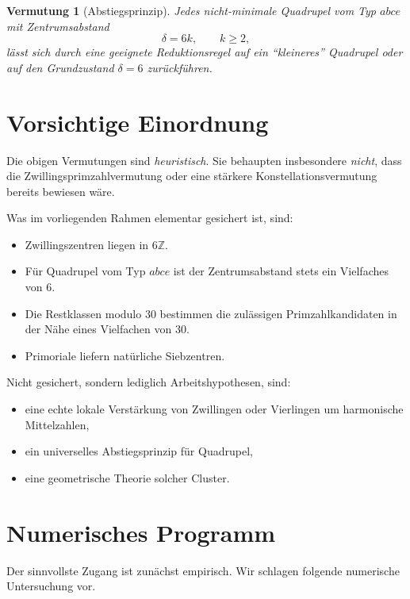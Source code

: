 \documentclass[11pt,a4paper]{article}
\theoremstyle{definition}
\theoremstyle{plain}
\newtheorem{conjecture}[definition]{Vermutung}
\theoremstyle{remark}
\newcommand{\Z}{\mathbb{Z}}
\begin{document}
	\begin{conjecture}[Abstiegsprinzip]
		Jedes nicht-minimale Quadrupel vom Typ $abce$ mit Zentrumsabstand
		\[
		\delta=6k,\qquad k\ge 2,
		\]
		lässt sich durch eine geeignete Reduktionsregel auf ein ``kleineres'' Quadrupel oder auf den Grundzustand $\delta=6$ zurückführen.
	\end{conjecture}
	
	\section{Vorsichtige Einordnung}
	
	Die obigen Vermutungen sind \emph{heuristisch}. 
	Sie behaupten insbesondere \emph{nicht}, dass die Zwillingsprimzahlvermutung oder eine stärkere Konstellationsvermutung bereits bewiesen wäre.
	
	Was im vorliegenden Rahmen elementar gesichert ist, sind:
	
	\begin{itemize}[leftmargin=1.5em]
		\item Zwillingszentren liegen in $6\Z$.
		\item Für Quadrupel vom Typ $abce$ ist der Zentrumsabstand stets ein Vielfaches von $6$.
		\item Die Restklassen modulo $30$ bestimmen die zulässigen Primzahlkandidaten in der Nähe eines Vielfachen von $30$.
		\item Primoriale liefern natürliche Siebzentren.
	\end{itemize}
	
	Nicht gesichert, sondern lediglich Arbeitshypothesen, sind:
	
	\begin{itemize}[leftmargin=1.5em]
		\item eine echte lokale Verstärkung von Zwillingen oder Vierlingen um harmonische Mittelzahlen,
		\item ein universelles Abstiegsprinzip für Quadrupel,
		\item eine geometrische Theorie solcher Cluster.
	\end{itemize}
	
	\section{Numerisches Programm}
	
	Der sinnvollste Zugang ist zunächst empirisch. 
	Wir schlagen folgende numerische Untersuchung vor.
	
\end{document}
